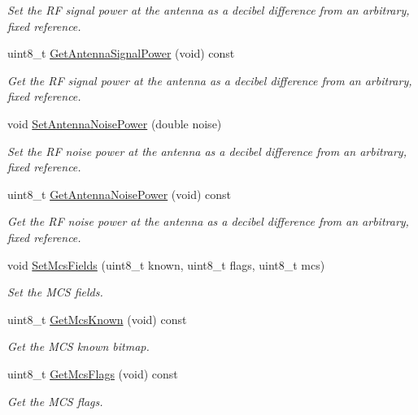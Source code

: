 \begin{DoxyCompactItemize}
\begin{DoxyCompactList}\small\item\em Set the RF signal power at the antenna as a decibel difference from an arbitrary, fixed reference. \end{DoxyCompactList}\item 
uint8\+\_\+t \hyperlink{classns3_1_1RadiotapHeader_af940caea4b54cc643fac11df5e7658ef}{Get\+Antenna\+Signal\+Power} (void) const 
\begin{DoxyCompactList}\small\item\em Get the RF signal power at the antenna as a decibel difference from an arbitrary, fixed reference. \end{DoxyCompactList}\item 
void \hyperlink{classns3_1_1RadiotapHeader_ab9536b3c7395d020899601690ff2cb26}{Set\+Antenna\+Noise\+Power} (double noise)
\begin{DoxyCompactList}\small\item\em Set the RF noise power at the antenna as a decibel difference from an arbitrary, fixed reference. \end{DoxyCompactList}\item 
uint8\+\_\+t \hyperlink{classns3_1_1RadiotapHeader_aa1cdc5247991cba7892fffd376a25683}{Get\+Antenna\+Noise\+Power} (void) const 
\begin{DoxyCompactList}\small\item\em Get the RF noise power at the antenna as a decibel difference from an arbitrary, fixed reference. \end{DoxyCompactList}\item 
void \hyperlink{classns3_1_1RadiotapHeader_a23f8dd27246529ba4c3d1fefa09a95f7}{Set\+Mcs\+Fields} (uint8\+\_\+t known, uint8\+\_\+t flags, uint8\+\_\+t mcs)
\begin{DoxyCompactList}\small\item\em Set the M\+CS fields. \end{DoxyCompactList}\item 
uint8\+\_\+t \hyperlink{classns3_1_1RadiotapHeader_a28b2cea041cbc86535ad252d5b51a278}{Get\+Mcs\+Known} (void) const 
\begin{DoxyCompactList}\small\item\em Get the M\+CS known bitmap. \end{DoxyCompactList}\item 
uint8\+\_\+t \hyperlink{classns3_1_1RadiotapHeader_a81bc8badb1e0380fd2b34607aab3dfe5}{Get\+Mcs\+Flags} (void) const 
\begin{DoxyCompactList}\small\item\em Get the M\+CS flags. \end{DoxyCompactList}\item 

\end{DoxyCompactItemize}
